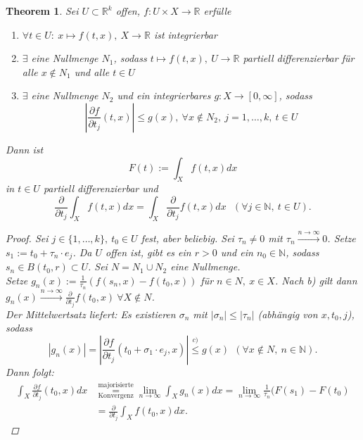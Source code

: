\documentclass[a4paper]{scrreprt}
\newcommand{\R}{\mathbb{R}}
\newcommand{\N}{\mathbb{N}}
\newcommand{\toInf}{\rightarrow \infty}
\newcommand{\limToInf}[1]{\lim_{#1 \toInf}}
\newcommand{\jlabel}[1]{\label{j_#1}}
\newcommand{\jabb}[3]{ #1: #2 \rightarrow #3 }
\theoremstyle{plain}
\newtheorem{thm}{Theorem}[chapter]
\theoremstyle{definition}
\begin{document}
{{{{\begin{thm}
\jlabel{Thm 3.16}
    Sei $U \subset \R^k$ offen, $\jabb{f}{U\times X}{\R}$ erfülle
    \begin{enumerate}
        \item $\forall t\in U: \ x\mapsto f(t,x), \ X \rightarrow \R$ ist integrierbar
        \item $\exists$ eine Nullmenge $N_1$, sodass $t\mapsto f(t,x), \ U\rightarrow \R$ partiell differenzierbar für alle $x\notin N_1$ und alle $t\in U$
        \item $\exists$ eine Nullmenge $N_2$ und ein integrierbares $\jabb{g}{X}{[0,\infty]}$, sodass
            \begin{displaymath}
                \left | \frac{\partial f}{\partial t_j}(t,x) \right | \le g(x), \ \forall x\notin N_2, \ j=1,\dots,k, \ t\in U
            \end{displaymath}
    \end{enumerate}
    Dann ist
    \begin{displaymath}
        F(t) := \int_X f(t,x)dx
    \end{displaymath}
    in $t\in U$ partiell differenzierbar und
    \begin{displaymath}
        \frac{\partial}{\partial t_j} \int_X f(t,x)dx = \int_X \frac{\partial}{\partial t_j} f(t,x) dx \ \ \ (\forall j \in \N, \ t\in U).
    \end{displaymath}
    \begin{proof}
        Sei $j\in \{1,\dots,k\}, \ t_0 \in U$ fest, aber beliebig. Sei $\tau_n \ne 0$ mit $\tau_n \xrightarrow{n \rightarrow \infty} 0$. Setze $s_1 := t_0 + \tau_n \cdot e_j$. Da $U$ offen ist, gibt es ein $r>0$ und ein $n_0 \in \N$, sodass $s_n \in B(t_0, r)\subset U$. Sei $N = N_1 \cup N_2$ eine Nullmenge.\\
        Setze $g_n(x) := \frac{1}{\tau_n}(f(s_n,x)-f(t_0,x))$ für $n\in N, \ x\in X$. Nach b) gilt dann $g_n(x) \xrightarrow{n \rightarrow \infty} \frac{\partial}{\partial t_j} f(t_0,x) \ \forall X\notin N$.\\
        Der Mittelwertsatz liefert: Es existieren $\sigma_n$ mit $|\sigma_n| \le |\tau_n|$ (abhängig von $x,t_0,j$), sodass
        \begin{displaymath}
            |g_n(x)| = \left | \frac{\partial f}{\partial t_j} (t_0+\sigma_1\cdot e_j, x) \right| \overset{c)}{\le} g(x) \ \ (\forall x\notin N, \ n\in \N).
        \end{displaymath}
        Dann folgt:
        \begin{displaymath}
            \begin{split}
                \int_X \frac{\partial f}{\partial t_j} (t_0, x)dx &\overset{\text{majorisierte}}{\underset{\text{Konvergenz}}{=}} \limToInf{n} \int_X g_n(x) dx = \limToInf{n} \frac{1}{\tau_n}(F(s_1) - F(t_0) \\
                &= \frac{\partial}{\partial t_j} \int_X f(t_0, x)dx.
            \end{split}
        \end{displaymath}
    \end{proof}
\end{thm}

}}}}
\end{document}
